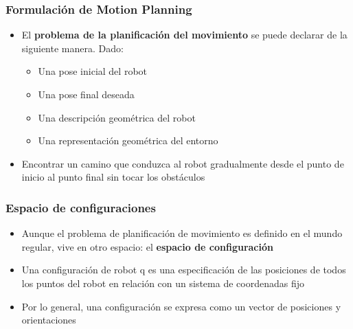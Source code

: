 \begin{frame}
	\frametitle{Formulación de Motion Planning}

	\begin{itemize}
		\item El {\bf problema de la planificación del movimiento} se puede declarar de la siguiente manera. Dado:
		\begin{itemize}
			\item Una pose inicial del robot
			\item Una pose final deseada
			\item Una descripción geométrica del robot
			\item Una representación geométrica del entorno
		\end{itemize}
		\item Encontrar un camino que conduzca al robot gradualmente desde el punto de inicio al punto final sin tocar los obstáculos
	\end{itemize}
\end{frame}

\begin{frame}
	\frametitle{Espacio de configuraciones}
	
	\begin{itemize}
		\item Aunque el problema de planificación de movimiento es 		definido en el mundo regular, vive en otro espacio: el {\bf espacio de configuración}
		\item Una configuración de robot q es una especificación de las posiciones de todos los puntos del robot en relación con un sistema de coordenadas fijo
		\item Por lo general, una configuración se expresa como un vector de posiciones y orientaciones
	\end{itemize}

	
\end{frame}

